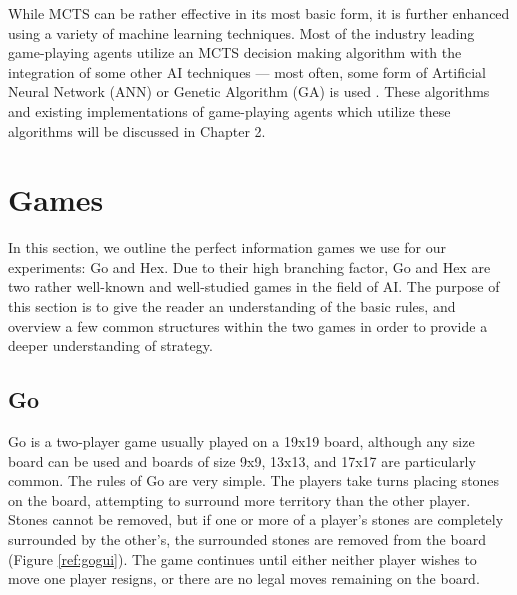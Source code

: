 While MCTS can be rather effective in its most basic form, it is further enhanced using a variety of machine learning techniques.  Most of the industry leading game-playing agents utilize an MCTS decision making algorithm with the integration of some other AI techniques --- most often, some form of Artificial Neural Network (ANN) or Genetic Algorithm (GA) is used \cite{browne2012survey}.  These algorithms and existing implementations of game-playing agents which utilize these algorithms will be discussed in Chapter 2.


\section{Games}\label{sec:games}
In this section, we outline the perfect information games we use for our experiments: Go and Hex.  Due to their high branching factor, Go and Hex are two rather well-known and well-studied games in the field of AI.  The purpose of this section is to give the reader an understanding of the basic rules, and overview a few common structures within the two games in order to provide a deeper understanding of strategy.

\subsection{Go}
Go is a two-player game usually played on a 19x19 board, although any size board can be used and boards of size 9x9, 13x13, and 17x17 are particularly common.  The rules of Go are very simple.  The players take turns placing stones on the board, attempting to surround more territory than the other player.  Stones cannot be removed, but if one or more of a player's stones are completely surrounded by the other's, the surrounded stones are removed from the board (Figure \ref{ref:gogui}).  The game continues until either neither player wishes to move one player resigns, or there are no legal moves remaining on the board.

